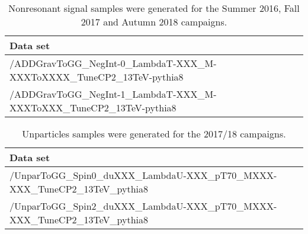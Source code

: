 \begin{table}[!htbp]
  \caption{Nonresonant signal samples were generated for the Summer 2016, Fall 2017 and Autumn 2018 campaigns.}
  \centering
  \vspace{\baselineskip}
  \begin{tabular}{lc}
  \hline \hline
  Data set\\
  \hline
  /ADDGravToGG\_NegInt-0\_LambdaT-XXX\_M-XXXToXXXX\_TuneCP2\_13TeV-pythia8 \\
  /ADDGravToGG\_NegInt-1\_LambdaT-XXX\_M-XXXToXXX\_TuneCP2\_13TeV-pythia8 \\
  \hline \hline
  \end{tabular}
  \label{table:ADDsamples}
\end{table}

\begin{table}[!htbp]
	\caption{Unparticles samples were generated for the 2017/18 campaigns.
}
	\centering
	\vspace{\baselineskip}
	\begin{tabular}{lc}
	\hline \hline
	Data set\\
	\hline
	/UnparToGG\_Spin0\_duXXX\_LambdaU-XXX\_pT70\_MXXX-XXX\_TuneCP2\_13TeV\_pythia8 \\
	/UnparToGG\_Spin2\_duXXX\_LambdaU-XXX\_pT70\_MXXX-XXX\_TuneCP2\_13TeV\_pythia8 \\
	\hline \hline
	\end{tabular}
	\label{table:UnparticlesSamples}
\end{table}

